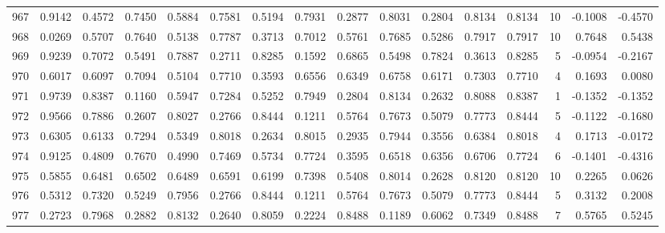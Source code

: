 \begin{tabular}{lrrrrrrrrrrrrrrr}
967 &      0.9142 &  0.4572 &  0.7450 &  0.5884 &  0.7581 &  0.5194 &  0.7931 &  0.2877 &  0.8031 &  0.2804 &   0.8134 &     0.8134 &     10 &                   -0.1008 &                    -0.4570 \\
968 &      0.0269 &  0.5707 &  0.7640 &  0.5138 &  0.7787 &  0.3713 &  0.7012 &  0.5761 &  0.7685 &  0.5286 &   0.7917 &     0.7917 &     10 &                    0.7648 &                     0.5438 \\
969 &      0.9239 &  0.7072 &  0.5491 &  0.7887 &  0.2711 &  0.8285 &  0.1592 &  0.6865 &  0.5498 &  0.7824 &   0.3613 &     0.8285 &      5 &                   -0.0954 &                    -0.2167 \\
970 &      0.6017 &  0.6097 &  0.7094 &  0.5104 &  0.7710 &  0.3593 &  0.6556 &  0.6349 &  0.6758 &  0.6171 &   0.7303 &     0.7710 &      4 &                    0.1693 &                     0.0080 \\
971 &      0.9739 &  0.8387 &  0.1160 &  0.5947 &  0.7284 &  0.5252 &  0.7949 &  0.2804 &  0.8134 &  0.2632 &   0.8088 &     0.8387 &      1 &                   -0.1352 &                    -0.1352 \\
972 &      0.9566 &  0.7886 &  0.2607 &  0.8027 &  0.2766 &  0.8444 &  0.1211 &  0.5764 &  0.7673 &  0.5079 &   0.7773 &     0.8444 &      5 &                   -0.1122 &                    -0.1680 \\
973 &      0.6305 &  0.6133 &  0.7294 &  0.5349 &  0.8018 &  0.2634 &  0.8015 &  0.2935 &  0.7944 &  0.3556 &   0.6384 &     0.8018 &      4 &                    0.1713 &                    -0.0172 \\
974 &      0.9125 &  0.4809 &  0.7670 &  0.4990 &  0.7469 &  0.5734 &  0.7724 &  0.3595 &  0.6518 &  0.6356 &   0.6706 &     0.7724 &      6 &                   -0.1401 &                    -0.4316 \\
975 &      0.5855 &  0.6481 &  0.6502 &  0.6489 &  0.6591 &  0.6199 &  0.7398 &  0.5408 &  0.8014 &  0.2628 &   0.8120 &     0.8120 &     10 &                    0.2265 &                     0.0626 \\
976 &      0.5312 &  0.7320 &  0.5249 &  0.7956 &  0.2766 &  0.8444 &  0.1211 &  0.5764 &  0.7673 &  0.5079 &   0.7773 &     0.8444 &      5 &                    0.3132 &                     0.2008 \\
977 &      0.2723 &  0.7968 &  0.2882 &  0.8132 &  0.2640 &  0.8059 &  0.2224 &  0.8488 &  0.1189 &  0.6062 &   0.7349 &     0.8488 &      7 &                    0.5765 &                     0.5245 \\

\end{tabular}
